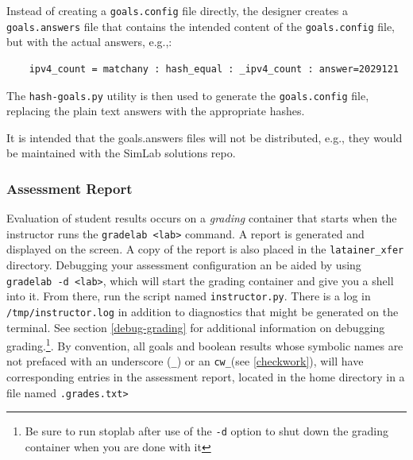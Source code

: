 \documentclass[12pt]{article}
\begin{document}
Instead of creating a {\tt goals.config} file directly, the designer creates a {\tt goals.answers} file that
contains the intended content of the {\tt goals.config} file, but with the actual answers, e.g.,:
\begin{verbatim}
    ipv4_count = matchany : hash_equal : _ipv4_count : answer=2029121
\end{verbatim}
\noindent The {\tt hash-goals.py} utility is then used to generate the {\tt goals.config} file, replacing
the plain text answers with the appropriate hashes.  

It is intended that the goals.answers files will not be distributed, e.g., they would be maintained with the
SimLab solutions repo.

\subsubsection{Assessment Report}
Evaluation of student results occurs on a \textit{grading} container
that starts when the instructor runs the {\tt gradelab <lab>} command. A report is generated
and displayed on the screen.  A copy of the report is also placed in the {\tt latainer\_xfer} directory. 
Debugging your assessment configuration an be aided by using {\tt gradelab -d <lab>}, which will start the
grading container and give you a shell into it.  From there, run the script named {\tt instructor.py}.
There is a log in {\tt /tmp/instructor.log} in addition to diagnostics that might be generated on the terminal.
See section \ref{debug-grading} for additional information on debugging grading.\footnote{Be sure to run
stoplab after use of the {\tt -d} option to shut down the grading container when you are done with it}.
By convention, all goals and boolean results whose symbolic names are not prefaced with an
underscore ({\tt\_}) or an {\tt cw\_}(see \ref{checkwork}), will have corresponding entries in the assessment report, located in 
the home directory in a file named {\tt <lab name>.grades.txt>}
\end{document}
